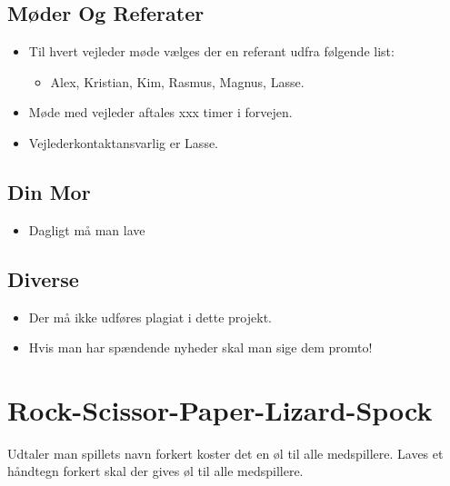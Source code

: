 \documentclass{article}
\begin{document}
\subsection{M\o{}der Og Referater}
\begin{itemize}
	\item Til hvert vejleder m\o{}de vælges der en referant udfra f\o{}lgende list:
	\begin{itemize}
		\item Alex, Kristian, Kim, Rasmus, Magnus, Lasse.
	\end{itemize}
	\item Møde med vejleder aftales xxx timer i forvejen.
	\item Vejlederkontaktansvarlig er Lasse. 
\end{itemize}

\subsection{Din Mor}
\begin{itemize}
	\item Dagligt m\aa{} man lave 
\end{itemize}


\subsection{Diverse}
\begin{itemize}
	\item Der må ikke udføres plagiat i dette projekt.
	\item Hvis man har spændende nyheder skal man sige dem promto!
\end{itemize}

\appendix
\section{Rock-Scissor-Paper-Lizard-Spock}
\item Udtaler man spillets navn forkert koster det en \o{}l til alle medspillere. Laves et h\aa{}ndtegn forkert skal der gives \o{}l til alle medspillere. 
\label{app:game}
\end{document}
